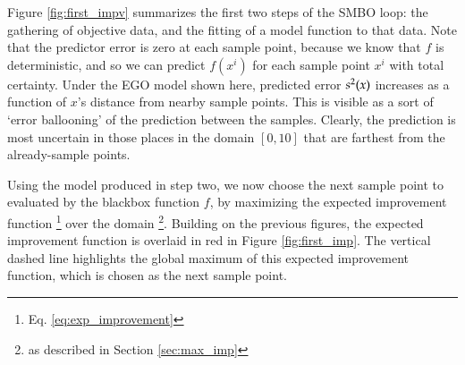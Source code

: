 Figure \ref{fig:first_impv} summarizes the first two steps of the SMBO loop: the gathering of objective data, and the fitting of a model function to that data. Note that the predictor error is zero at each sample point, because we know that $f$ is deterministic, and so we can predict $f(x^i)$ for each sample point $x^i$ with total certainty. Under the EGO model shown here, predicted error $s^2(x)$ increases as a function of $x$'s distance from nearby sample points. This is visible as a sort of `error ballooning' of the prediction between the samples. Clearly, the prediction is most uncertain in those places in the domain $[0,10]$ that are farthest from the already-sample points.


Using the model produced in step two, we now choose the next sample point to evaluated by the blackbox function $f$, by maximizing the expected improvement function \footnote{Eq. \ref{eq:exp_improvement}} over the domain \footnote{as described in Section \ref{sec:max_imp}}. Building on the previous figures, the expected improvement function is overlaid in red in Figure \ref{fig:first_imp}. The vertical dashed line highlights the global maximum of this expected improvement function, which is chosen as the next sample point.

